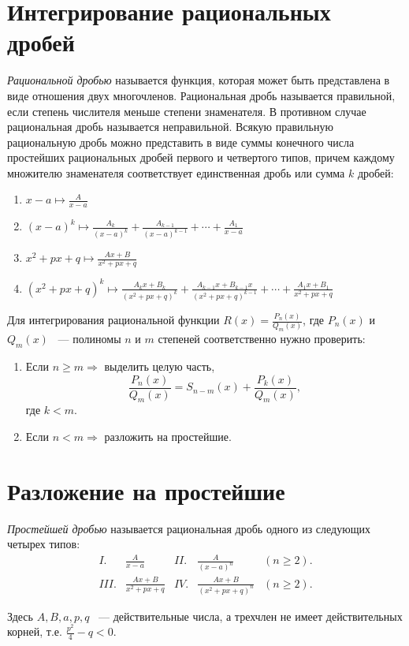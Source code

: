 \documentclass[11pt]{article}
\begin{document}
	\section{Интегрирование рациональных дробей}
	\textit{Рациональной дробью} называется функция, которая может быть представлена в виде отношения двух многочленов. Рациональная дробь называется правильной, если степень числителя меньше степени знаменателя. В противном случае рациональная дробь называется неправильной. Всякую правильную рациональную дробь можно представить в виде суммы конечного числа простейших рациональных дробей первого и четвертого типов, причем каждому множителю знаменателя соответствует единственная дробь или сумма $k$ дробей:
	\begin{enumerate}
		\item $x - a \mapsto\frac{A}{x - a}$
		\item $(x - a)^k \mapsto\frac{A_k}{(x - a)^k} + \frac{A_{k-1}}{(x - a)^{k-1}} + \cdots + \frac{A_1}{x - a}$
		\item $x^2 + px + q\mapsto\frac{Ax + B}{x^2 + px + q}$
		\item $(x^2 + px + q)^k \mapsto\frac{A_kx + B_k}{(x^2 + px + q)^k} + \frac{A_{k-1}x + B_{k-1}x}{(x^2 + px + q)^{k-1}} + \cdots + \frac{A_1x + B_1}{x^2 + px + q}$
	\end{enumerate}
	Для интегрирования рациональной функции $R(x) = \frac{P_n(x)}{Q_m(x)}$, где $P_n(x)$ и $Q_m(x)$ ~--- полиномы $n$ и $m$ степеней соответственно нужно проверить:
	\begin{enumerate}
		\item Если $n \ge m\Rightarrow$ выделить целую часть,
		$$
			\frac{P_n(x)}{Q_m(x)} = S_{n - m}(x) + \frac{P_k(x)}{Q_m(x)}, 
		$$
		где $k < m$.
		\item Если $n < m\Rightarrow$ разложить на простейшие.
	\end{enumerate}
	\section{Разложение на простейшие}
	\textit{Простейшей дробью} называется рациональная дробь одного из следующих четырех типов:
	\begin{align}
		I. & \frac{A}{x-a} & II. & \frac{A}{(x-a)^n} & (n\ge 2).\\
		III. & \frac{Ax + B}{x^2 + px + q} & IV. & \frac{Ax + B}{(x^2 + px + q)^n} & (n \ge 2).
	\end{align}

	Здесь $A, B, a, p, q$ ~--- действительные числа, а трехчлен не имеет действительных корней, т.е. $\frac{p^2}{4}-q < 0$.
\end{document}
